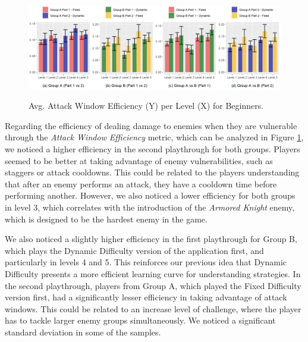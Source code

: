 \begin{figure}[ht]
    \begin{center}
    \caption{Avg. Attack Window Efficiency (Y) per Level (X) for Beginners.}
        \includegraphics[width=\textwidth]{figures/attack_window_efficiency-beginner_players.png}
        \label{fig:result-metric-beginners-attack-window-efficiency}
    \end{center}
\end{figure}

Regarding the efficiency of dealing damage to enemies when they are vulnerable through the \emph{Attack Window Efficiency} metric, which can be analyzed in Figure \ref{fig:result-metric-beginners-attack-window-efficiency}, we noticed a higher efficiency in the second playthrough for both groups. Players seemed to be better at taking advantage of enemy vulnerabilities, such as staggers or attack cooldowns. This could be related to the players understanding that after an enemy performs an attack, they have a cooldown time before performing another. However, we also noticed a lower efficiency for both groups in level 3, which correlates with the introduction of the \emph{Armored Knight} enemy, which is designed to be the hardest enemy in the game.

We also noticed a slightly higher efficiency in the first playthrough for Group B, which plays the Dynamic Difficulty version of the application first, and particularly in levels 4 and 5. This reinforces our previous idea that Dynamic Difficulty presents a more efficient learning curve for understanding strategies. In the second playthrough, players from Group A, which played the Fixed Difficulty version first, had a significantly lesser efficiency in taking advantage of attack windows. This could be related to an increase level of challenge, where the player has to tackle larger enemy groups simultaneously. We noticed a significant standard deviation in some of the samples.

